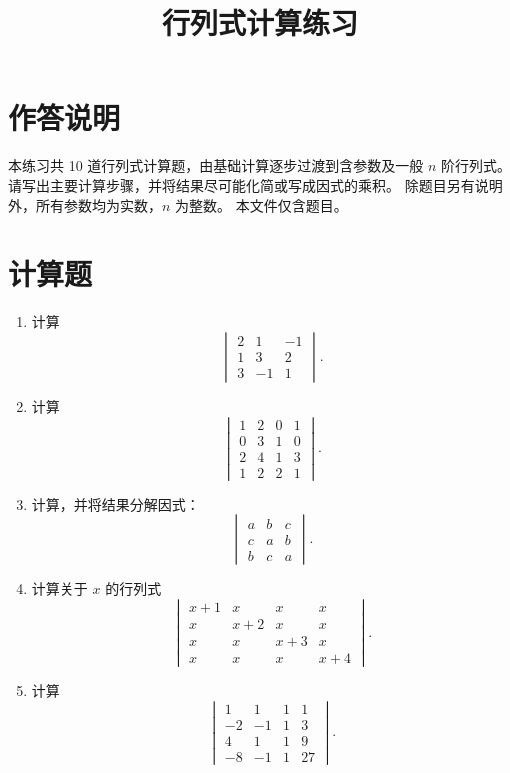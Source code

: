 \documentclass[UTF8,12pt,a4paper,fontset=fandol]{ctexart}
\title{行列式计算练习}
\author{}
\date{}
\begin{document}
\maketitle

\section*{作答说明}
本练习共 10 道行列式计算题，由基础计算逐步过渡到含参数及一般 $n$ 阶行列式。
请写出主要计算步骤，并将结果尽可能化简或写成因式的乘积。
除题目另有说明外，所有参数均为实数，$n$ 为整数。
本文件仅含题目。

\section*{计算题}
\begin{enumerate}[label=\arabic*.]

\item\label{q:detcalc-three}
计算
\[
\begin{vmatrix}
2&1&-1\\
1&3&2\\
3&-1&1
\end{vmatrix}.
\]

\item\label{q:detcalc-four}
计算
\[
\begin{vmatrix}
1&2&0&1\\
0&3&1&0\\
2&4&1&3\\
1&2&2&1
\end{vmatrix}.
\]

\item\label{q:detcalc-cyclic-three}
计算，并将结果分解因式：
\[
\begin{vmatrix}
a&b&c\\
c&a&b\\
b&c&a
\end{vmatrix}.
\]

\item\label{q:detcalc-parameter}
计算关于 $x$ 的行列式
\[
\begin{vmatrix}
x+1&x&x&x\\
x&x+2&x&x\\
x&x&x+3&x\\
x&x&x&x+4
\end{vmatrix}.
\]

\item\label{q:detcalc-powers}
计算
\[
\begin{vmatrix}
1&1&1&1\\
-2&-1&1&3\\
4&1&1&9\\
-8&-1&1&27
\end{vmatrix}.
\]


\end{enumerate}
\end{document}
